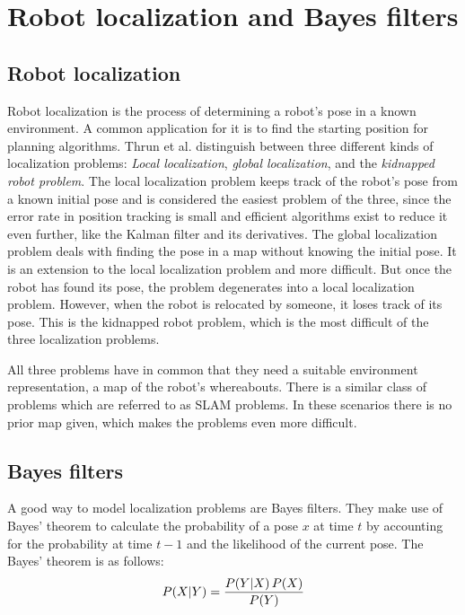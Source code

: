\documentclass[Thesis.tex]{subfiles}
\begin{document}
\chapter{Robot localization and Bayes filters}

\section{Robot localization}

Robot localization is the process of determining a robot's pose in a known environment. A common application for it is to find the starting position for planning algorithms. Thrun et al. distinguish between three different kinds of localization problems: \emph{Local localization}, \emph{global localization}, and the \emph{kidnapped robot problem}\cite{ThrunBurgardFox:2005}. The local localization problem keeps track of the robot's pose from a known initial pose and is considered the easiest problem of the three, since the error rate in position tracking is small and efficient algorithms exist to reduce it even further, like the Kalman filter and its derivatives\cite{ThrunBurgardFox:2005}. The global localization problem deals with finding the pose in a map without knowing the initial pose. It is an extension to the local localization problem and more difficult. But once the robot has found its pose, the problem degenerates into a local localization problem. However, when the robot is relocated by someone, it loses track of its pose. This is the kidnapped robot problem, which is the most difficult of the three localization problems.

All three problems have in common that they need a suitable environment representation, a map of the robot's whereabouts. There is a similar class of problems which are referred to as \gls{SLAM} problems. In these scenarios there is no prior map given, which makes the problems even more difficult. 


\section{Bayes filters}
A good way to model localization problems are Bayes filters. They make use of Bayes' theorem to calculate the probability of a pose $x$ at time $t$ by accounting for the probability at time $t-1$ and the likelihood of the current pose. The Bayes' theorem is as follows:
%
\begin{align}
\p[P]{X}{Y} = \frac{ \p[P]{Y}{X} P(X) } { P(Y) }
\end{align}
\end{document}
